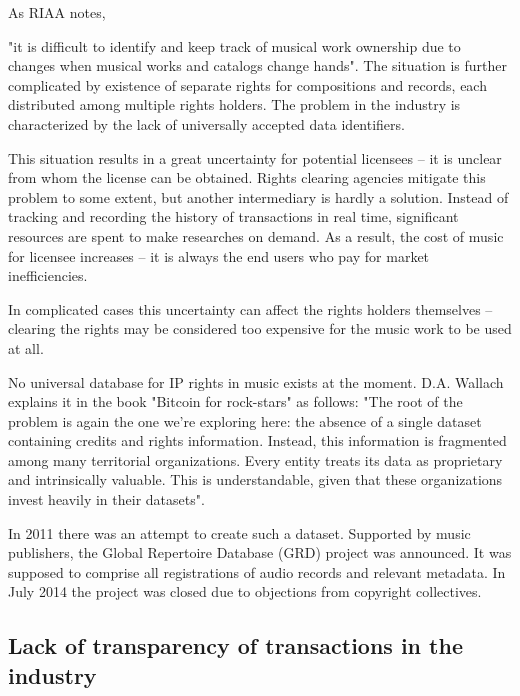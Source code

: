 \documentclass[12pt]{report}
\begin{document}
As RIAA notes, 
\begin{framed}
"it is difficult to identify and keep track of musical work ownership due to changes when musical works and catalogs change hands". The situation is further complicated by existence of separate rights for compositions and records, each distributed among multiple rights holders. The problem in the industry is characterized by the lack of universally accepted data identifiers.
 
This situation results in a great uncertainty for potential licensees – it is unclear from whom the license can be obtained. Rights clearing agencies mitigate this problem to some extent, but another intermediary is hardly a solution. Instead of tracking and recording the history of transactions in real time, significant resources are spent to make researches on demand. As a result, the cost of music for licensee increases – it is always the end users who pay for market inefficiencies.
 
In complicated cases this uncertainty can affect the rights holders themselves – clearing the rights may be considered too expensive for the music work to be used at all.
 
No universal database for IP rights in music exists at the moment. D.A. Wallach explains it in the book "Bitcoin for rock-stars" as follows: "The root of the problem is again the one we’re exploring here: the absence of a single dataset containing credits and rights information. Instead, this information is fragmented among many territorial organizations. Every entity treats its data as proprietary and intrinsically valuable. This is understandable, given that these organizations invest heavily in their datasets".
\end{framed}
 
In 2011 there was an attempt to create such a dataset. Supported by music publishers, the Global Repertoire Database (GRD) project was announced. It was supposed to comprise all registrations of audio records and relevant metadata. In July 2014 the project was closed due to objections from copyright collectives.
\vfill\null\pagebreak

\subsection{Lack of transparency of transactions in the industry}
\end{document}
